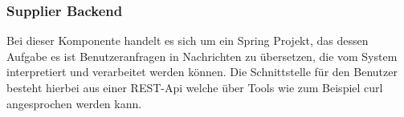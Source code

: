 

\subsubsection{Supplier Backend}
Bei dieser Komponente handelt es sich um ein Spring Projekt, das dessen Aufgabe es ist Benutzeranfragen in Nachrichten zu übersetzen, die vom System interpretiert und verarbeitet werden können. Die Schnittstelle für den Benutzer besteht hierbei aus einer REST-Api welche über Tools wie zum Beispiel curl angesprochen werden kann.

